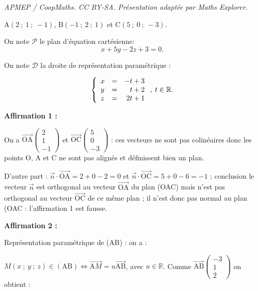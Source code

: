 \documentclass[10pt]{article}
\providecommand{\R}{\mathbb{R}}
\providecommand{\vect}[1]{\overrightarrow{#1}}
\begin{document}
\noindent\textit{APMEP / CoopMaths. CC BY-SA. Présentation adaptée par Maths Explorer.}\par\medskip
\medskip










\begin{center}A$(2~;~1~;~-1)$, \quad B$(-1~;~2~;~1)$ et \quad C$(5~;~0~;~-3)$.\end{center}

On note $\mathcal{P}$ le plan d'équation cartésienne:
\[x + 5y - 2z + 3 = 0.\]

On note $\mathcal{D}$ la droite de représentation paramétrique :

\[\left\{\begin{array}{l c r}
x&=&-t +3\\
y&=&t+ 2\\
z &=& 2t +1
\end{array}\right., \: t \in \R.\]

\medskip

\textbf{Affirmation 1 :}


On a $\vect{\text{OA}}\begin{pmatrix}2\\1\\-1\end{pmatrix}$ et $\vect{\text{OC}}\begin{pmatrix}5\\0\\-3\end{pmatrix}$ : ces vecteurs ne sont pas colinéaires donc les points O, A et C ne sont pas alignés et définissent bien un plan.

D'autre part : $\vect{n} \cdot \vect{\text{OA}} = 2 + 0 - 2 = 0$ et $\vect{n} \cdot \vect{\text{OC}} = 5 + 0 - 6 = - 1$ ; conclusion le vecteur $\vect{n}$ est orthogonal au vecteur $\vect{\text{OA}}$ du plan (OAC) mais n'est pas orthogonal au vecteur $\vect{\text{OC}}$ de ce même plan ; il n'est donc pas normal au plan (OAC : l'affirmation 1 est fausse.
\medskip

\textbf{Affirmation 2 :}



Représentation paramétrique de (AB) : on a :

$M(x~;~y~;~z) \in (\text{AB}) \iff \vect{\text{A}M} = u\vect{\text{AB}}$, avec $u \in \R$.
Comme $\vect{\text{AB}}\begin{pmatrix}-3\\1\\2\end{pmatrix}$ on obtient :
\end{document}
